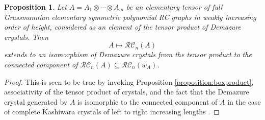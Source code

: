 \documentclass[a4paper,fleqn]{cas-sc}
\newtheorem{corollary}[lemma]{Corollary}
\newtheorem{proposition}[lemma]{Proposition}
\theoremstyle{definition}
\theoremstyle{remark}
\numberwithin{equation}{subsection}
\newcommand{\wof}[1]{w_{#1}}
\newcommand{\RC}{\mathcal{RC}}
\newcommand{\maxd}{\mathfrak{m}}
\begin{document}
\begin{proposition}\label{proposition:liftcrystaliso}
Let $A = A_1\otimes\cdots \otimes A_m$ be an elementary tensor of full Grassmannian elementary symmetric polynomial RC graphs in weakly increasing order of height, considered as an element of the tensor product of Demazure crystals. Then 
$$A\mapsto\RC_n(A)$$
extends to an isomorphism of Demazure crystals from the tensor product to the connected component of $\RC_n(A)\subseteq \RC_n(\wof{A})$.
\end{proposition}
\begin{proof}
This is seen to be true by invoking Proposition \ref{proposition:boxproduct}, associativity of the tensor product of crystals, and the fact that the Demazure crystal generated by $A$ is isomorphic to the connected component of $A$ in the case of complete Kashiwara crystals of left to right increasing lengths \cite{kouno2020decomposition}.
\end{proof}

\end{document}
